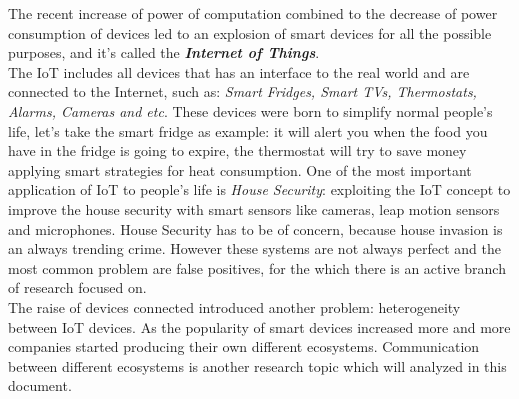 %
%
%

The recent increase of power of computation combined to the decrease of power
consumption of devices led to an explosion of smart devices for all the possible
purposes, and it's called the \textit{\textbf{Internet of Things}}.\\
The IoT includes all devices that has an interface to the real world
and are connected to the Internet, such as: \textit{Smart Fridges, Smart TVs, Thermostats,
Alarms, Cameras and etc}. These devices were born to simplify normal people's life,
let's take the smart fridge as example: it will alert you when the food you have in the
fridge is going to expire, the thermostat will try to save money applying smart
strategies for heat consumption. One of the most important application of IoT
to people's life is \textit{House Security}: exploiting the IoT concept to improve the house
security with smart sensors like cameras, leap motion sensors and microphones.
House Security has to be of concern, because house invasion is an always trending
crime. However these systems are not always perfect and the most common problem are
false positives, for the which there is an active branch of research focused on.\\
The raise of devices connected introduced another problem: heterogeneity between
IoT devices. As the popularity of smart devices increased more and more companies
started producing their own different ecosystems. Communication between different
ecosystems is another research topic which will analyzed in this document.
